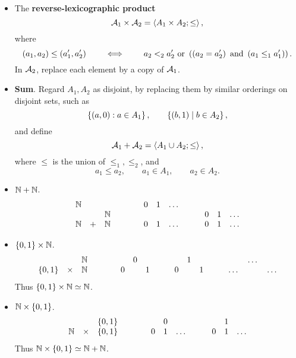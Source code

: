 \begin{definition}
\hfill
\begin{itemize}
\item The \textbf{reverse-lexicographic product}
$$ \AA_1 \times \AA_2 = \ab{A_1 \times A_2; \le}, $$
where
$$ \rb{a_1, a_2} \le \rb{a_1', a_2'} \qquad \iff \qquad a_2 <_2 a_2' \ \text{or} \ \rb{\rb{a_2 = a_2'} \ \text{and} \ \rb{a_1 \le_1 a_1'}}. $$
In $ \AA_2 $, replace each element by a copy of $ \AA_1 $.
\item \textbf{Sum}. Regard $ A_1, A_2 $ as disjoint, by replacing them by similar orderings on disjoint sets, such as
$$ \cb{\rb{a, 0} : a \in A_1}, \qquad \cb{\rb{b, 1} \mid b \in A_2}, $$
and define
$$ \AA_1 + \AA_2 = \ab{A_1 \cup A_2; \le}, $$
where $ \le $ is the union of $ \le_1, \le_2 $, and
$$ a_1 \le a_2, \qquad a_1 \in A_1, \qquad a_2 \in A_2. $$
\end{itemize}
\end{definition}

\begin{example2}
\hfill
\begin{itemize}
\item $ \N + \N $.
$$
\begin{array}{ccccccccccc}
\N & & & \qquad & 0 & 1 & \dots & \quad & & & \\
& & \N & \qquad & & & & \quad & 0 & 1 & \dots \\
\N & + & \N & \qquad & 0 & 1 & \dots & \quad & 0 & 1 & \dots
\end{array}
$$
\item $ \cb{0, 1} \times \N $.
$$
\begin{array}{ccccccccccccccc}
& & \N & \qquad & & 0 & & \quad & & 1 & & \quad & & \dots & \\
\cb{0, 1} & \times & \N & \qquad & 0 & & 1 & \quad & 0 & & 1 & \quad & \dots & & \dots
\end{array}
$$
Thus $ \cb{0, 1} \times \N \simeq \N $.
\item $ \N \times \cb{0, 1} $.
$$
\begin{array}{ccccccccccc}
& & \cb{0, 1} & \qquad & & 0 & & \quad & & 1 & \\
\N & \times & \cb{0, 1} & \qquad & 0 & 1 & \dots & \quad & 0 & 1 & \dots
\end{array}
$$
Thus $ \N \times \cb{0, 1} \simeq \N + \N $.
\end{itemize}
\end{example2}

\pagebreak

